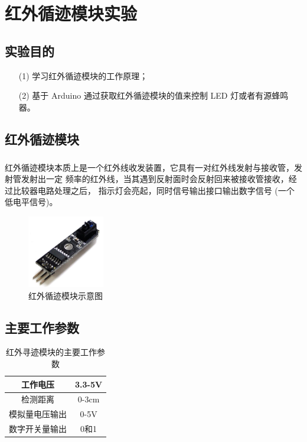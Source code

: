 \documentclass[UTF8, oneside]{ctexbook}
\begin{document}
\chapter{红外循迹模块实验}
\section{实验目的}
\begin{itemize}
    \item[(1)] 学习红外循迹模块的工作原理；
    \item[(2)] 基于 Arduino 通过获取红外循迹模块的值来控制 LED 灯或者有源蜂鸣器。
\end{itemize}

\section{红外循迹模块}
\paragraph{}
红外循迹模块本质上是一个红外线收发装置，它具有一对红外线发射与接收管，发射管发射出一定
频率的红外线，当其遇到反射面时会反射回来被接收管接收，经过比较器电路处理之后，
指示灯会亮起，同时信号输出接口输出数字信号 (一个低电平信号)。
\begin{figure}[h]
    \centering
    \includegraphics[width=0.3\textwidth]{./result/sensor/12/sensor.png}
    \caption{红外循迹模块示意图}
    \label{12_sensor}
\end{figure}

\section{主要工作参数}
\begin{table}[h]
    \centering
    \begin{tabular}{|c|c|}
    \hline
    工作电压    & 3.3-5V \\ \hline
    检测距离    & 0-3cm  \\ \hline
    模拟量电压输出 & 0-5V   \\ \hline
    数字开关量输出 & 0和1    \\ \hline
    \end{tabular}
    \caption{红外寻迹模块的主要工作参数}
\end{table}
\end{document}
